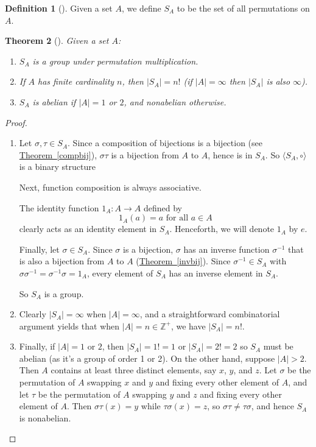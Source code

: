 \documentclass[10pt,]{book}
\theoremstyle{plain}
\newtheorem{theorem}{Theorem}[section]
\theoremstyle{definition}
\newtheorem{definition}[theorem]{Definition}
\theoremstyle{definition}
\theoremstyle{definition}
\theoremstyle{definition}
\numberwithin{equation}{section}
\def\Z{\mathbb{Z}}
\begin{document}
\begin{definition}[{}]\label{definition-45}
\label{notation-56}
Given a set \(A\), we define \(S_A\) to be the set of all permutations on \(A\).%
\end{definition}
\begin{theorem}[{}]\label{sym}
Given a set \(A\): \leavevmode%
\begin{enumerate}
\item\hypertarget{li-322}{}\(S_A\) is a group under permutation multiplication.%
\item\hypertarget{li-323}{}If \(A\) has finite cardinality \(n\), then \(|S_A|=n!\) (if \(|A|=\infty\) then \(|S_A|\) is also \(\infty\)).%
\item\hypertarget{li-324}{}\(S_A\) is abelian if \(|A|=1\) or \(2\), and nonabelian otherwise.%
\end{enumerate}
%
\end{theorem}
\begin{proof}\hypertarget{proof-31}{}
\leavevmode%
\begin{enumerate}
\item\hypertarget{li-325}{}Let \(\sigma, \tau \in S_A\). Since a composition of bijections is a bijection (see \hyperref[compbij]{Theorem~\ref{compbij}}), \(\sigma
\tau\) is a bijection from \(A\) to \(A\), hence is in \(S_A\). So \(\langle S_A,\circ\rangle\) is a binary structure%
\par
Next, function composition is always associative.%
\par
The identity function \(1_A : A\to A\) defined by%
\begin{equation*}
1_A(a)=a \text{ for all \(a\in A\)}
\end{equation*}
clearly acts as an identity element in \(S_A\). Henceforth, we will denote \(1_A\) by \(e\).%
\par
Finally, let \(\sigma \in S_A\).  Since \(\sigma\) is a bijection, \(\sigma\) has an inverse function \(\sigma^{-1}\) that is also a bijection from \(A\) to \(A\) (\hyperref[invbij]{Theorem~\ref{invbij}}). Since \(\sigma^{-1}\in S_A\) with \(\sigma
\sigma^{-1}= \sigma^{-1} \sigma=1_A\), every element of \(S_A\) has an inverse element in \(S_A\).%
\par
So \(S_A\) is a group.%
\item\hypertarget{li-326}{}Clearly \(|S_A|=\infty\) when \(|A|=\infty\), and a straightforward combinatorial argument yields that when \(|A|=n \in \Z^+\), we have \(|S_A|=n!\).%
\item\hypertarget{li-327}{}Finally, if \(|A|=1\) or \(2\), then \(|S_A|=1!=1\) or \(|S_A|=2!=2\) so \(S_A\) must be abelian (as it's a group of order 1 or 2). On the other hand, suppose \(|A|>2\). Then \(A\) contains at least three distinct elements, say \(x\), \(y\), and \(z\). Let \(\sigma\) be the permutation of \(A\) swapping \(x\) and \(y\) and fixing every other element of \(A\), and let \(\tau\) be the permutation of \(A\) swapping \(y\) and \(z\) and fixing every other element of \(A\). Then \(\sigma
\tau(x)=y\) while \(\tau \sigma(x)=z\), so \(\sigma \tau \neq \tau
\sigma\), and hence \(S_A\) is nonabelian.%
\end{enumerate}
%
\end{proof}
\end{document}
